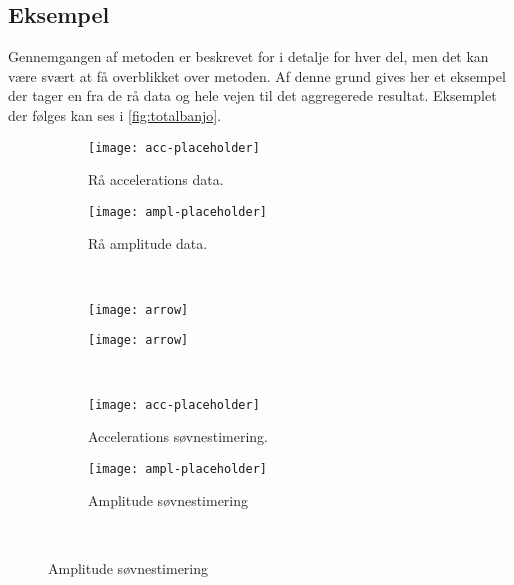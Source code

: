 \subsection{Eksempel}
Gennemgangen af metoden er beskrevet for i detalje for hver del, men det kan være svært at få overblikket over metoden.
Af denne grund gives her et eksempel der tager en fra de rå data og hele vejen til det aggregerede resultat.
Eksemplet der følges kan ses i \cref{fig:totalbanjo}.
\begin{figure}
	\begin{minipage}{\linewidth}
		\begin{subfigure}{0.5\linewidth}
			\centering
			\texttt{[image: acc-placeholder]}
			\caption{Rå accelerations data.}\label{fig:rawaccplot}
		\end{subfigure}
		\begin{subfigure}{0.5\linewidth}
			\centering
			\texttt{[image: ampl-placeholder]}
			\caption{Rå amplitude data.}\label{fig:rawamplplot}
		\end{subfigure}
	\end{minipage}\\[1ex]%
	\begin{minipage}{\linewidth}
		\begin{subfigure}{0.5\linewidth}
			\centering
			\texttt{[image: arrow]}
		\end{subfigure}
		\begin{subfigure}{0.5\linewidth}
			\centering
			\texttt{[image: arrow]}
		\end{subfigure}
	\end{minipage}\\[1ex]%
	\begin{minipage}{\linewidth}
		\begin{subfigure}{0.5\linewidth}
			\centering
			\texttt{[image: acc-placeholder]}
			\caption{Accelerations søvnestimering.}\label{fig:sleepcalcaccplot}
		\end{subfigure}
		\begin{subfigure}{0.5\linewidth}
			\centering
			\texttt{[image: ampl-placeholder]}
			\caption{Amplitude søvnestimering}\label{fig:sleepcalcamplplot}
		\end{subfigure}
	\end{minipage}\\[1ex]%
	\begin{minipage}{\linewidth}

\end{minipage}
\end{figure}
